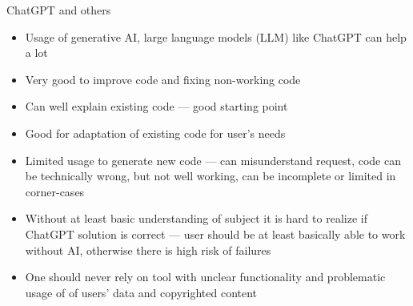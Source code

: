 \documentclass[compress, xelatex, 11pt, xcolor=svgnames, aspectratio=169,
	hyperref={
		bookmarks=true,
		unicode=true,
		colorlinks=true,
		pdftitle={Molecular data in R},
		plainpages=false,
		pdfauthor={Vojtech Zeisek},
		pdfsubject={Course about phylogeny and evolution in R},
		pdfcreator={XeLaTeX},
		pdfkeywords={R, evolution, phylogeny, molecular data},
		linkcolor=Crimson, %
		anchorcolor=Magenta, %
		citecolor=Magenta, %
		filecolor=Magenta, %
		menucolor=Magenta, %
		urlcolor=DodgerBlue, %
		},
	url={hyphens, lowtilde} %
	]{beamer}
\begin{document}
\begin{frame}{ChatGPT and others}
	\begin{itemize}
		\item Usage of generative AI, large language models (LLM) like ChatGPT can help a lot
		\item Very good to improve code and fixing non-working code
		\item Can well explain existing code --- good starting point
		\item Good for adaptation of existing code for user's needs
		\item Limited usage to generate new code --- can misunderstand request, code can be technically wrong, but not well working, can be incomplete or limited in corner-cases
		\item Without at least basic understanding of subject it is hard to realize if ChatGPT solution is correct --- user should be at least basically able to work without AI, otherwise there is high risk of failures
		\item One should never rely on tool with unclear functionality and problematic usage of of users' data and copyrighted content
	\end{itemize}
\end{frame}
\end{document}
